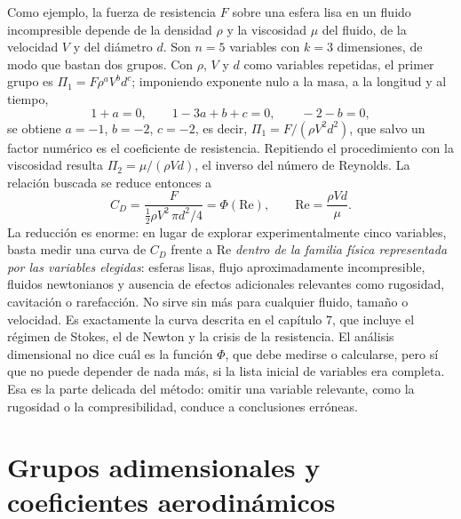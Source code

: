 \documentclass[10pt,openany]{book}
\begin{document}
Como ejemplo, la fuerza de resistencia \(F\) sobre una esfera lisa en un fluido incompresible depende de la densidad \(\rho\) y la viscosidad \(\mu\) del fluido, de la velocidad \(V\) y del diámetro \(d\). Son \(n = 5\) variables con \(k = 3\) dimensiones, de modo que bastan dos grupos. Con \(\rho\), \(V\) y \(d\) como variables repetidas, el primer grupo es \(\Pi_1 = F\rho^{a}V^{b}d^{c}\); imponiendo exponente nulo a la masa, a la longitud y al tiempo,
\begin{equation}
1 + a = 0,\qquad 1 - 3a + b + c = 0,\qquad -2 - b = 0, \label{eq:c10-exponentes}
\end{equation}
se obtiene \(a = -1\), \(b = -2\), \(c = -2\), es decir, \(\Pi_1 = F/(\rho V^{2} d^{2})\), que salvo un factor numérico es el coeficiente de resistencia. Repitiendo el procedimiento con la viscosidad resulta \(\Pi_2 = \mu/(\rho V d)\), el inverso del número de Reynolds. La relación buscada se reduce entonces a
\begin{equation}
C_D = \frac{F}{\tfrac12\rho V^{2}\,\pi d^{2}/4} = \Phi(\mathrm{Re}), \qquad \mathrm{Re} = \frac{\rho V d}{\mu}. \label{eq:c10-esfera}
\end{equation}
La reducción es enorme: en lugar de explorar experimentalmente cinco variables, basta medir una curva de \(C_D\) frente a \(\mathrm{Re}\) \emph{dentro de la familia física representada por las variables elegidas}: esferas lisas, flujo aproximadamente incompresible, fluidos newtonianos y ausencia de efectos adicionales relevantes como rugosidad, cavitación o rarefacción. No sirve sin más para cualquier fluido, tamaño o velocidad. Es exactamente la curva descrita en el capítulo 7, que incluye el régimen de Stokes, el de Newton y la crisis de la resistencia. El análisis dimensional no dice cuál es la función \(\Phi\), que debe medirse o calcularse, pero sí que no puede depender de nada más, si la lista inicial de variables era completa. Esa es la parte delicada del método: omitir una variable relevante, como la rugosidad o la compresibilidad, conduce a conclusiones erróneas.

\section{Grupos adimensionales y coeficientes aerodinámicos}
\end{document}
